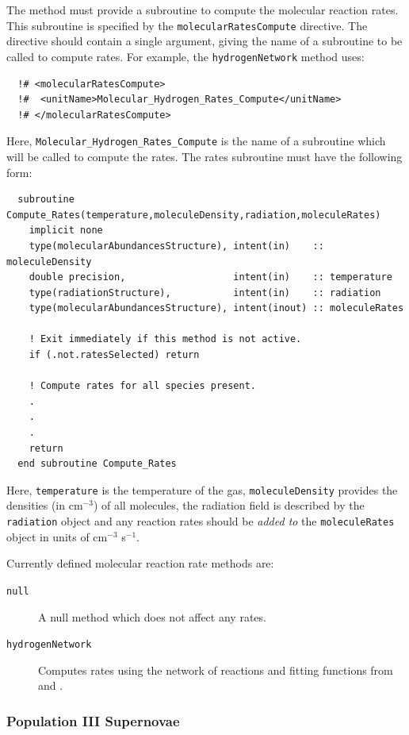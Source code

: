 The method must provide a subroutine to compute the molecular reaction rates. This subroutine is specified by the {\tt molecularRatesCompute} directive. The directive should contain a single argument, giving the name of a subroutine to be called to compute rates. For example, the {\tt hydrogenNetwork} method uses:
\begin{verbatim}
  !# <molecularRatesCompute>
  !#  <unitName>Molecular_Hydrogen_Rates_Compute</unitName>
  !# </molecularRatesCompute> 
\end{verbatim}
Here, {\tt Molecular\_Hydrogen\_Rates\_Compute} is the name of a subroutine which will be called to compute the rates. The rates subroutine must have the following form:
\begin{verbatim}
  subroutine Compute_Rates(temperature,moleculeDensity,radiation,moleculeRates)
    implicit none
    type(molecularAbundancesStructure), intent(in)    :: moleculeDensity
    double precision,                   intent(in)    :: temperature
    type(radiationStructure),           intent(in)    :: radiation
    type(molecularAbundancesStructure), intent(inout) :: moleculeRates

    ! Exit immediately if this method is not active.
    if (.not.ratesSelected) return

    ! Compute rates for all species present.
    .
    .
    .
    return
  end subroutine Compute_Rates
\end{verbatim}
Here, {\tt temperature} is the temperature of the gas, {\tt moleculeDensity} provides the densities (in cm$^{-3}$) of all molecules, the radiation field is described by the {\tt radiation} object and any reaction rates should be \emph{added to} the {\tt moleculeRates} object in units of cm$^{-3}$ s$^{-1}$.

Currently defined molecular reaction rate methods are:
\begin{description}
 \item [{\tt null}] A null method which does not affect any rates.
 \item [{\tt hydrogenNetwork}] Computes rates using the network of reactions and fitting functions from \cite{abel_modeling_1997} and \cite{tegmark_small_1997}.
\end{description}

\subsubsection{Population III Supernovae}


